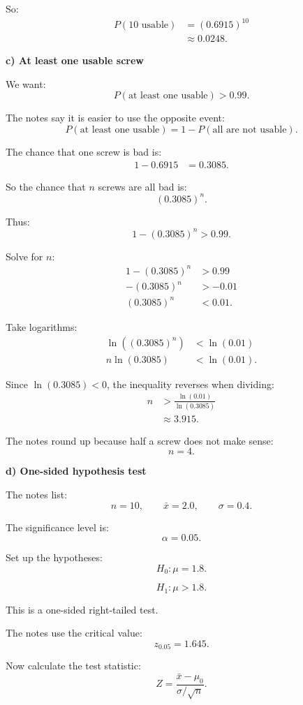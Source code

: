 \documentclass[10pt]{article}
\begin{document}
So:
\begin{align*}
P(\text{10 usable})
&=
(0.6915)^{10}
\\[2mm]
&\approx
0.0248.
\end{align*}

\textbf{c) At least one usable screw}

We want:
\[
P(\text{at least one usable})>0.99.
\]

The notes say it is easier to use the opposite event:
\[
P(\text{at least one usable})
=
1-P(\text{all are not usable}).
\]

The chance that one screw is bad is:
\begin{align*}
1-0.6915
&=
0.3085.
\end{align*}

So the chance that \(n\) screws are all bad is:
\[
(0.3085)^n.
\]

Thus:
\[
1-(0.3085)^n>0.99.
\]

Solve for \(n\):
\begin{align*}
1-(0.3085)^n
&>0.99
\\[2mm]
-(0.3085)^n
&>-0.01
\\[2mm]
(0.3085)^n
&<0.01.
\end{align*}

Take logarithms:
\begin{align*}
\ln\left((0.3085)^n\right)
&<
\ln(0.01)
\\[2mm]
n\ln(0.3085)
&<
\ln(0.01).
\end{align*}

Since \(\ln(0.3085)<0\), the inequality reverses
when dividing:
\begin{align*}
n
&>
\frac{\ln(0.01)}{\ln(0.3085)}
\\[2mm]
&\approx
3.915.
\end{align*}

The notes round up because half a screw does not make
sense:
\[
n=4.
\]

\textbf{d) One-sided hypothesis test}

The notes list:
\[
n=10,
\qquad
\bar{x}=2.0,
\qquad
\sigma=0.4.
\]

The significance level is:
\[
\alpha=0.05.
\]

Set up the hypotheses:
\[
H_0:\mu=1.8.
\]

\[
H_1:\mu>1.8.
\]

This is a one-sided right-tailed test.

The notes use the critical value:
\[
z_{0.05}=1.645.
\]

Now calculate the test statistic:
\[
Z=
\frac{\bar{x}-\mu_0}{\sigma/\sqrt{n}}.
\]
\end{document}

